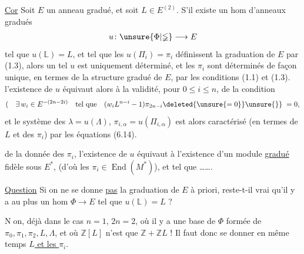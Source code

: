 \uline{Cor} Soit $E$ un anneau gradué,  et soit $L\in E^{(2)}$. S'il existe un hom d'anneaux gradués
\[
u\colon \unsure{\Phi|\mathbb{\Phi}}\longrightarrow E
\]
tel que $u(\mathbb L)=L$, et tel que les $u(\Pi_i)=\pi_i$ définissent la graduation de $E$ par (1.3), alors un tel $u$ est uniquement déterminé, et les $\pi_i$ sont déterminés de façon unique, en termes de la structure  gradué de $E$, par les conditions (1.1) et (1.3).   l'existence de $u$ équivaut alors à  la validité, pour  $0\leq i\leq n$, de la condition
\[
(\quad\exists\,w_i\in E^{-(2n-2i)}\quad\text{tel que}\quad (w_i L^{n-i}-1)\pi_{2n-i}\deleted{\unsure{=0}}\unsure{\}}\;=0,
\]
et  le système des $\lambda=u(\Lambda)$,  $\pi_{i,\alpha}=u(\Pi_{i,\alpha})$ est alors caractérisé (en termes de $L$ et des $\pi_i$) par les équations (6.14).  

 de la donnée des $\pi_i$, l'existence de $u$ équivaut à l'existence d'un module \uline{gradué} fidèle sous $E^*$,   (d'où les $\pi_i\in\operatorname{End}(M^*)$), et tel que \ldots\ldots .

\uline{Question} Si on ne se donne \uline{pas} la graduation de $E$ à priori,  reste-t-il vrai qu'il y a au plus un hom $\Phi\to E$ tel que $u(\mathbb L)=L$ ?

\textcircled{Non}, déjà dans le cas $n=1$, $2n=2$, où il y a une base de $\Phi$ formée de $\pi_0,\pi_1,\pi_2,L,\Lambda$, et où $\mathbb Z[L]$ n'est que $\mathbb Z+\mathbb Z L$ ! Il faut donc se donner en même temps \uline{$L$ et les $\pi_i$}.
